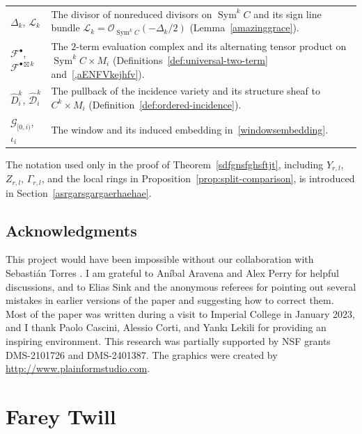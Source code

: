 \documentclass[11pt,letterpaper]{amsart}
\theoremstyle{plain}
\theoremstyle{definition}
\theoremstyle{remark}
\numberwithin{equation}{section}
\DeclareMathOperator{\Sym}{Sym}
\begin{document}
\begin{longtable}{@{}p{}p{}@{}}
$\Delta_k$, $\mathscr L_k$ & The divisor of nonreduced divisors on
$\Sym^kC$ and its sign line bundle
$\mathscr L_k=\mathcal O_{\Sym^kC}(-\Delta_k/2)$
(Lemma~\ref{amazinggrace}).\\[2pt]
$\mathcal F^\bullet$, $\mathcal F^{\bullet\boxtimes k}$ & The $2$-term
evaluation complex and its alternating tensor product on $\Sym^kC\times M_i$
(Definitions~\ref{def:universal-two-term} and~\ref{,aENFVkejhfv}).\\[2pt]
$\widehat D_i^k$, $\widehat{\mathcal D}_i^k$ & The pullback of the
incidence variety and its structure sheaf to $C^k\times M_i$
(Definition~\ref{def:ordered-incidence}).\\[2pt]
$\mathcal G_{[0,i)}$, $\iota_i$ & The window and its induced embedding
in~\eqref{windowsembedding}.  %
\\
\bottomrule
\end{longtable}
The notation used only in the proof of
Theorem~\ref{sdfgnsfghsftjt}, including $Y_{r,l}$,
$Z_{r,l}$, $\Gamma_{r,l}$, and the local rings in
Proposition~\ref{prop:split-comparison}, is introduced in Section~\ref{asrgarsgargaerhaehae}.


\subsection*{Acknowledgments}
This project would have been impossible without our collaboration
with Sebasti\'an Torres \cite{TT}.
I am grateful to An\'ibal Aravena and Alex Perry
for helpful discussions, and to Elias Sink and the anonymous referees
for pointing out several mistakes in earlier versions of the paper and
suggesting how to correct them.
Most of the paper was written during a visit to Imperial College
in January 2023, and I thank Paolo Cascini, Alessio Corti, and
Yank{\i} Lekili for providing an inspiring environment.
This research was partially supported by NSF grants DMS-2101726
and DMS-2401387.
The graphics were created by \url{http://www.plainformstudio.com}.


\tableofcontents

\section{Farey Twill}\label{TwillSection}
\end{document}
